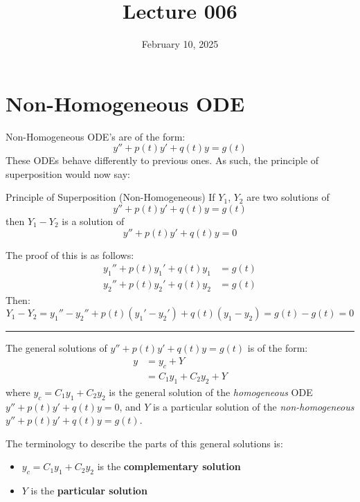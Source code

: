 \documentclass[12pt]{article}
\title{Lecture 006}
\date{February 10, 2025}
\begin{document}
\newpage
\section{Non-Homogeneous ODE}
\label{sec:nonHomogeneousODE}

Non-Homogeneous ODE's are of the form:
\begin{equation*}
  y'' + p(t)y' + q(t)y = g(t)
\end{equation*}
These ODEs behave differently to previous ones. As such, the principle of superposition would now say:

\begin{definition}{Principle of Superposition (Non-Homogeneous)}
  If $Y_1$, $Y_2$ are two solutions of
  \begin{equation*}
    y'' + p(t)y' + q(t)y = g(t)
  \end{equation*}
  then $Y_1-Y_2$ is a solution of
  \begin{equation*}
    y'' + p(t)y' + q(t)y = 0
  \end{equation*}
\end{definition}

The proof of this is as follows:
\begin{align*}
  y_1'' + p(t)y_1' + q(t)y_1 &= g(t) \\
  y_2'' + p(t)y_2' + q(t)y_2 &= g(t)
\end{align*}
Then:
\begin{equation*}
  Y_1 - Y_2 = y_1''-y_2'' + p(t)\left(y_1'-y_2'\right) + q(t)\left(y_1-y_2\right) = g(t)-g(t) = 0
\end{equation*}
\vspace{12pt}
\hrule
\vspace{12pt}
The general solutions of $y'' + p(t)y' + q(t)y = g(t)$ is of the form:
\begin{align*}
  y &= y_c + Y \\
    &= C_1y_1 + C_2y_2 + Y
\end{align*}
where $y_c = C_1y_1 + C_2y_2$ is the general solution of the \textit{homogeneous} ODE $y'' + p(t)y' + q(t)y = 0$, and $Y$ is a particular solution of the \textit{non-homogeneous} $y'' + p(t)y' + q(t)y = g(t)$.

The terminology to describe the parts of this general solutions is:
\begin{itemize}
  \itemsep0em
  \item $y_c = C_1y_1 + C_2y_2$ is the {\color{re} \textbf{complementary solution}}
  \item $Y$ is the {\color{re} \textbf{particular solution}}
\end{itemize}
\end{document}
